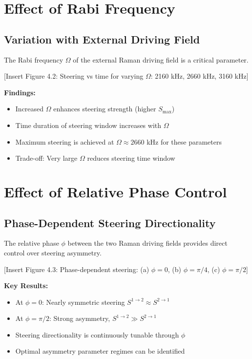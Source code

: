 \section{Effect of Rabi Frequency}

\subsection{Variation with External Driving Field}

The Rabi frequency $\Omega$ of the external Raman driving field is a critical parameter.

[Insert Figure 4.2: Steering vs time for varying $\Omega$: 2160 kHz, 2660 kHz, 3160 kHz]

\textbf{Findings:}
\begin{itemize}
	\item Increased $\Omega$ enhances steering strength (higher $S_{\max}$)
	\item Time duration of steering window increases with $\Omega$
	\item Maximum steering is achieved at $\Omega \approx 2660$ kHz for these parameters
	\item Trade-off: Very large $\Omega$ reduces steering time window
\end{itemize}

\section{Effect of Relative Phase Control}

\subsection{Phase-Dependent Steering Directionality}

The relative phase $\phi$ between the two Raman driving fields provides direct control over steering asymmetry.

[Insert Figure 4.3: Phase-dependent steering: (a) $\phi = 0$, (b) $\phi = \pi/4$, (c) $\phi = \pi/2$]

\textbf{Key Results:}
\begin{itemize}
	\item At $\phi = 0$: Nearly symmetric steering $S^{1 \to 2} \approx S^{2 \to 1}$
	\item At $\phi = \pi/2$: Strong asymmetry, $S^{1 \to 2} \gg S^{2 \to 1}$
	\item Steering directionality is continuously tunable through $\phi$
	\item Optimal asymmetry parameter regimes can be identified
\end{itemize}

